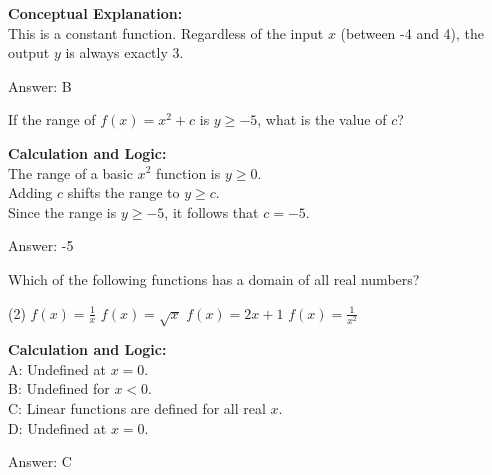 \documentclass[11pt,paper=a4,answers]{exam}
\begin{document}
\begin{questions}
\begin{solution}
\textbf{Conceptual Explanation:} \\
This is a constant function. Regardless of the input $x$ (between -4 and 4), the output $y$ is always exactly 3.

\vspace{30pt}

Answer: \colorbox{yellow!100}{B}
\end{solution}

\vspace{40pt}

\question
If the range of $f(x) = x^2 + c$ is $y \geq -5$, what is the value of $c$?

\begin{solution}
\textbf{Calculation and Logic:} \\
The range of a basic $x^2$ function is $y \geq 0$. \\
Adding $c$ shifts the range to $y \geq c$. \\
Since the range is $y \geq -5$, it follows that $c = -5$.

\vspace{30pt}

Answer: \colorbox{yellow!100}{-5}
\end{solution}

\vspace{40pt}

\question
Which of the following functions has a domain of all real numbers?
\begin{tasks}(2)
    \task $f(x) = \frac{1}{x}$
    \task $f(x) = \sqrt{x}$
    \task $f(x) = 2x + 1$
    \task $f(x) = \frac{1}{x^2}$
\end{tasks}

\begin{solution}
\textbf{Calculation and Logic:} \\
A: Undefined at $x=0$. \\
B: Undefined for $x < 0$. \\
C: Linear functions are defined for all real $x$. \\
D: Undefined at $x=0$.

\vspace{30pt}

Answer: \colorbox{yellow!100}{C}
\end{solution}


\end{questions}
\end{document}
